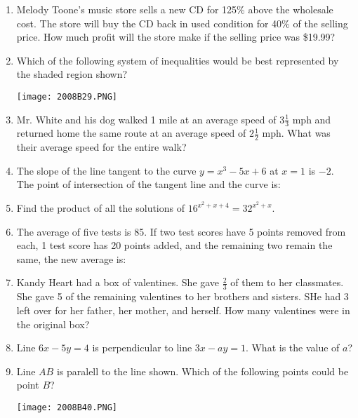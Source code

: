 \documentclass[../uilmath.tex]{subfiles}
\begin{document}
\begin{enumerate}[label=\bfseries\arabic*.]
        \item %
        Melody Toone's music store sells a new CD for 125\% above the wholesale cost. The store will buy the CD back in used 
        condition for 40\% of the selling price. How much profit will the store make if the selling price was \$19.99?

        \item %
        Which of the following system of inequalities would be best represented by the shaded region shown?
        \begin{center}
            \texttt{[image: 2008B29.PNG]}
        \end{center}

        \item %
        Mr. White and his dog walked 1 mile at an average speed of $3\frac{1}{3}$ mph and returned home the same route at an average speed of 
        $2\frac{1}{2}$ mph. What was their average speed for the entire walk?

        \item %
        The slope of the line tangent to the curve $y=x^3-5x+6$ at $x=1$ is $-2$. The point of intersection of the tangent line and the curve is:

        \item %
        Find the product of all the solutions of $16^{x^2+x+4}=32^{x^2+x}$.

        \item %
        The average of five tests is 85. If two test scores have 5 points removed from each, 1 test score has 20 points added, and the remaining two remain the same, the new average is:

        \item %
        Kandy Heart had a box of valentines. She gave $\frac{2}{3}$ of them to her classmates. She gave 5 of the remaining valentines to her brothers and sisters. SHe had 3 left over for her father, her mother, and herself.
        How many valentines were in the original box?
        
        \item %
        Line $6x-5y=4$ is perpendicular to line $3x-ay=1$. What is the value of $a$?

        \item %
        Line $AB$ is paralell to the line shown. Which of the following points could be point $B$?
        \begin{center}
            \texttt{[image: 2008B40.PNG]}
        \end{center}


\end{enumerate}
\end{document}
